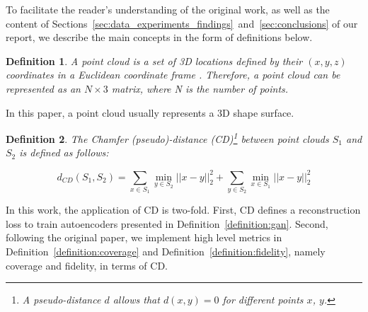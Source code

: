 \documentclass[12pt]{article}
\newtheorem{definition}{Definition}
\begin{document}
    To facilitate the reader's understanding of the original work, as well as the content of Sections~\ref{sec:data_experiments_findings}~and~\ref{sec:conclusions} of our report, we describe the main concepts in the form of definitions below.

    \begin{definition}
        \normalfont
        A \emph{point cloud} is a set of 3D locations defined by their $(x, y, z)$ coordinates in a Euclidean coordinate frame \cite{pmlr-v80-achlioptas18a}. Therefore, a point cloud can be represented as an $N \times 3$ matrix, where N is the number of points.
        \label{definition:point_cloud}
    \end{definition}

    In this paper, a point cloud usually represents a 3D shape surface.

    \begin{definition}
        \normalfont
        The \emph{Chamfer (pseudo)-distance (CD)}\footnote{
            A pseudo-distance $d$ allows that $d(x, y) = 0$ for different points $x$, $y$.} between point clouds $S_1$ and $S_2$ is defined as follows:

        \begin{equation}
            d_{CD}(S_{1}, S_{2}) =
            \sum_{x \in S_{1}} \min _{y \in S_{2}} || x - y||_{2}^{2} + \sum_{y \in S_{2}} \min_{x \in S_{1}} ||x - y||_{2}^{2}
            \label{equation:chamfer_distance}
        \end{equation}
        \label{definition:chamfer_distance}
    \end{definition}

    In this work, the application of CD is two-fold. First, CD defines a reconstruction loss to train autoencoders presented in Definition~\ref{definition:gan}. Second, following the original paper, we implement high level metrics in Definition~\ref{definition:coverage} and Definition~\ref{definition:fidelity}, namely coverage and fidelity, in terms of CD.
\end{document}
